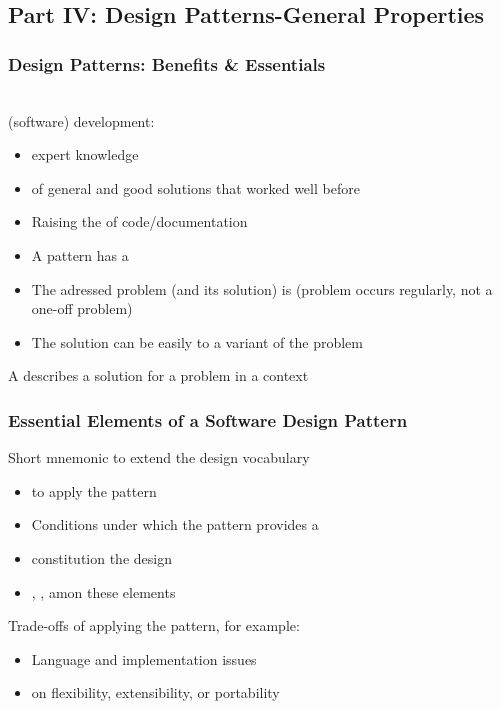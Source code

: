 \subsection{Part IV: Design Patterns-General Properties}
\subsubsection{Design Patterns: Benefits \& Essentials}
\\
 (software) development:
\begin{itemize}
    \item {} expert knowledge
    \item {} of general and good solutions that worked well before
    \item Raising the  of code/documentation
\end{itemize}
\begin{itemize}
    \item A pattern has a 
    \item The adressed problem (and its solution) is  (problem occurs regularly, not a one-off problem)
    \item The solution can be easily  to a variant of the problem
\end{itemize}
\begin{defBox}
    A  describes a solution for a problem in a context
\end{defBox}
\subsubsection{Essential Elements of a Software Design Pattern}
 Short mnemonic to extend the design vocabulary\\
\begin{itemize}
    \item {} to apply the pattern
    \item Conditions under which the pattern provides a 
\end{itemize}
\begin{itemize}
    \item {} constitution the design 
    \item {}, ,  amon these elements
\end{itemize}
 Trade-offs of applying the pattern, for example:
\begin{itemize}
    \item Language and implementation issues
    \item {} on flexibility, extensibility, or portability
\end{itemize}
